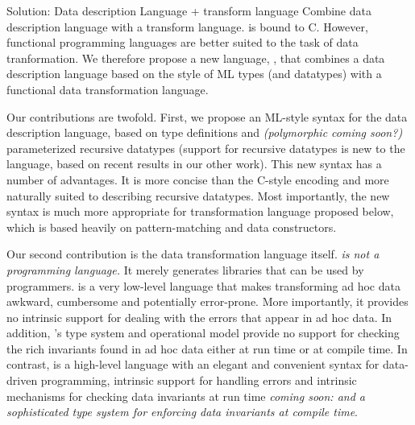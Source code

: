 Solution: Data description Language + transform language
Combine data description language with a transform language.
\pads{} is bound to C. However, functional programming languages are
better suited to the task of data tranformation. We therefore propose
a new language, \datatype{}, that combines a data description language
based on the style of ML types (and datatypes) with a functional data
transformation language. 

Our contributions are twofold. First, we propose an ML-style syntax
for the \pads{} data description language, based on type definitions
and {\em(polymorphic coming soon?)} parameterized recursive datatypes
(support for recursive datatypes is new to the \pads{} language, based
on recent results in our other work). This new syntax has a number of
advantages. It is more concise than the C-style encoding and more
naturally suited to describing recursive datatypes. Most importantly,
the new syntax is much more appropriate for transformation language
proposed below, which is based heavily on pattern-matching and data
constructors.

Our second contribution is the data transformation language itself.
{\em \pads{} is not a programming language.}  It merely generates
libraries that can be used by \C{} programmers.  \C{} is a very
low-level language that makes transforming ad hoc data awkward,
cumbersome and potentially error-prone.  More importantly, it provides
no intrinsic support for dealing with the errors that appear in ad hoc
data.  In addition, \C's type system and operational model provide no
support for checking the rich invariants found in ad hoc data either
at run time or at compile time.  In contrast, \datatype{} is a
high-level language with an elegant and convenient syntax for
data-driven programming, intrinsic support for handling errors and
intrinsic mechanisms for checking data invariants at run time {\em
  coming soon: and a sophisticated type system for enforcing data
  invariants at compile time}. 

